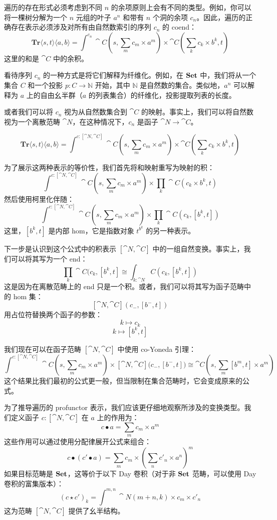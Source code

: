 \documentclass[DaoFP]{subfiles}
\begin{document}
遍历的存在形式必须考虑到不同 $n$ 的余项原则上会有不同的类型。例如，你可以将一棵树分解为一个 $n$ 元组的叶子 $a^n$ 和带有 $n$ 个洞的余项 $c_n$。因此，遍历的正确存在表示必须涉及对所有由自然数索引的序列 $c_n$ 的 coend：
\[ \mathbf{Tr} \langle s, t\rangle \langle a, b \rangle = \int^{c_n} \cat C (s, \sum_m c_m \times a^m) \times \cat C (\sum_k c_k \times b^k, t) \]
这里的和是 $\cat C$ 中的余积。

看待序列 $c_n$ 的一种方式是将它们解释为纤维化。例如，在 $\mathbf{Set}$ 中，我们将从一个集合 $C$ 和一个投影 $p \colon C \to \mathbb N$ 开始，其中 $\mathbb N$ 是自然数的集合。类似地，$a^n$ 可以解释为 $a$ 上的自由幺半群（$a$ 的列表集合）的纤维化，投影提取列表的长度。

或者我们可以将 $c_n$ 视为从自然数集合到 $\cat C$ 的映射。事实上，我们可以将自然数视为一个离散范畴 $\cat N$，在这种情况下，$c_n$ 是函子 $\cat N \to \cat C$。

\[ \mathbf{Tr} \langle s, t\rangle \langle a, b \rangle = \int^{c \colon [\cat N, \cat C]} \cat C (s, \sum_m c_m \times a^m) \times \cat C (\sum_k c_k \times b^k, t) \]

为了展示这两种表示的等价性，我们首先将和映射重写为映射的积：
\[\int^{c \colon [\cat N, \cat C]} \cat C (s, \sum_m c_m \times a^m) \times \prod_k \cat C (c_k \times b^k, t) \]
然后使用柯里化伴随：
\[\int^{c \colon [\cat N, \cat C]} \cat C (s, \sum_m c_m \times a^m) \times \prod_k \cat C (c_k,  [b^k, t]) \]
这里，$[b^k, t]$ 是内部 hom，它是指数对象 $t^{b^k}$ 的另一种表示。

下一步是认识到这个公式中的积表示 $[\cat N, \cat C]$ 中的一组自然变换。事实上，我们可以将其写为一个 end：
 \[ \prod_k \cat C (c_k,  [b^k, t] \cong \int_{k : \cat N} C (c_k,  [b^k, t]) \]
这是因为在离散范畴上的 end 只是一个积。或者，我们可以将其写为函子范畴中的 hom 集：
\[ [\cat N, \cat C](c_{-}, [b^{-}, t]) \]
用占位符替换两个函子的参数：
\[ k \mapsto c_k \]
\[ k \mapsto [b^k, t] \]

我们现在可以在函子范畴 $[\cat N, \cat C]$ 中使用 co-Yoneda 引理：
\[\int^{c \colon [\cat N, \cat C]} \cat C (s, \sum_m c_m \times a^m) \times  [\cat N, \cat C]\big(c_{-}, [b^{-}, t]\big) \cong \cat C(s, \sum_m [b^m, t] \times a^m)\]
这个结果比我们最初的公式更一般，但当限制在集合范畴时，它会变成原来的公式。

为了推导遍历的 profunctor 表示，我们应该更仔细地观察所涉及的变换类型。我们定义函子 $c \colon [\cat N, \cat C]$ 在 $a$ 上的作用为：
\[ c \bullet a = \sum_m c_m \times a^m \]
这些作用可以通过使用分配律展开公式来组合：
\[ c \bullet (c' \bullet a) = \sum_m c_m \times (\sum_n c'_n \times a^n)^m \]
如果目标范畴是 $\mathbf{Set}$，这等价于以下 Day 卷积（对于非 $\mathbf{Set}$ 范畴，可以使用 Day 卷积的富集版本）：
\[ (c \star c')_k = \int^{m, n} \cat N (m + n, k) \times c_m \times c'_n \]
这为范畴 $[\cat N, \cat C]$ 提供了幺半结构。
\end{document}
